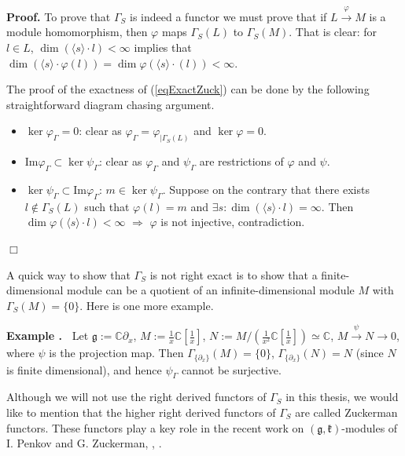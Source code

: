 \documentclass[12pt]{report}
\newenvironment{example}{ \smallskip \addtocounter{theo}{1} \noindent \textbf{Example  \arabic{section}.\arabic{theo}~}}{}%
\newenvironment{proof}[1][]{ \textbf{Proof#1. }}{$\Box$\medskip}
\newcommand {\CC} {\mathbb {C}}
\newcommand{\kk}{\mathfrak{k}}
\newcommand{\gG}{\mathfrak{g}}
\renewcommand {\phi} {\varphi}
\newcommand{\refeq}[1]{(\ref{#1})}
\newcommand{\im}{\mathrm{Im}}
\newcommand {\del} {\partial}
\begin{document}
\begin{proof}
To prove that $\Gamma_S$ is indeed a functor we must prove that if $L\overset{\phi}{\to}M$ is a module homomorphism, then $\phi$ maps $\Gamma_S(L)$ to $\Gamma_S(M)$. That is clear: for $l\in L$, $\dim (\langle s\rangle \cdot l)<\infty$ implies that $\dim (\langle s\rangle \cdot \phi(l))=\dim \phi(\langle s\rangle \cdot(l))<\infty$.

The proof of the exactness of \refeq{eqExactZuck} can be done by the following straightforward diagram chasing  argument.
\begin{itemize}
\item $\ker \phi_\Gamma=0$: clear as $\phi_\Gamma=\phi_{|\Gamma_S(L)}$ and $\ker \phi=0$.
\item $\im\phi_\Gamma\subset\ker \psi_\Gamma$: clear as $\phi_\Gamma$ and $\psi_\Gamma$ are restrictions of $\phi$ and $\psi$.
\item $\ker \psi_\Gamma\subset\im\phi_\Gamma$: $m\in\ker\psi_\Gamma$. Suppose on the contrary that there exists $l\notin\Gamma_S(L)$ such that $\phi(l)=m$ and $\exists s: \dim(\langle s\rangle \cdot l)=\infty$. Then $\dim\phi(\langle s\rangle \cdot l)<\infty$ $\Rightarrow$ $\phi$ is not injective, contradiction.
\end{itemize}
\end{proof}

A quick way to show that $\Gamma_S$ is not right exact is to show that a finite-dimensional module can be a quotient of an infinite-dimensional module $M$ with $\Gamma_S(M)=\{0\}$. Here is one more example.
 
\begin{example}
Let $\gG:=\CC\del_x$, $M:=\frac{1}{x}\CC[\frac{1}{x}]$, $N:=M/(\frac{1}{x^2}\CC[\frac{1}{x}])\simeq \CC$, $M\overset{\psi}{\to}N\to 0$, where $\psi$ is the projection map. Then $\Gamma_{\{\del_x\}}(M)=\{0\}$, $\Gamma_{\{\del_x\}}(N)=N$ (since $N$ is finite dimensional), and hence $\psi_\Gamma$ cannot be surjective.
\end{example}

Although we will not use the right derived functors of $\Gamma_S$ in this thesis, we would like to mention that the higher right derived functors of $\Gamma_S$ are called Zuckerman functors. These functors play a key role in the recent work on $(\gG,\kk)$-modules of I. Penkov and G. Zuckerman, \cite{PZ}, \cite{PZ:ArbitraryMinKtype}.
\end{document}

